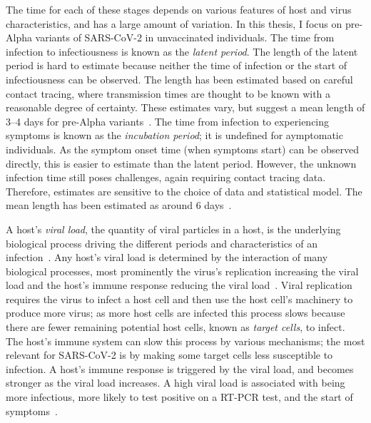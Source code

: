 \documentclass[thesis.tex]{subfiles}
\begin{document}
The time for each of these stages depends on various features of host and virus characteristics, and has a large amount of variation.
In this thesis, I focus on pre-Alpha variants of SARS-CoV-2 in unvaccinated individuals.
The time from infection to infectiousness is known as the \emph{latent period}.
The length of the latent period is hard to estimate because neither the time of infection or the start of infectiousness can be observed.
The length has been estimated based on careful contact tracing, where transmission times are thought to be known with a reasonable degree of certainty.
These estimates vary, but suggest a mean length of 3--4 days for pre-Alpha variants~\autocite[and references therein]{zhaoEstimating}.
The time from infection to experiencing symptoms is known as the \emph{incubation period}; it is undefined for aymptomatic individuals.
As the symptom onset time (when symptoms start) can be observed directly, this is easier to estimate than the latent period.
However, the unknown infection time still poses challenges, again requiring contact tracing data.
Therefore, estimates are sensitive to the choice of data and statistical model.
The mean length has been estimated as around 6 days~\autocite{wuIncubation,quesadaIncubation,aleneSerial}.

A host's \emph{viral load}, the quantity of viral particles in a host, is the underlying biological process driving the different periods and characteristics of an infection~\autocite{puhachSARSCoV2}.
Any host's viral load is determined by the interaction of many biological processes, most prominently the virus's replication increasing the viral load and the host's immune response reducing the viral load~\autocite{keVivo}.
Viral replication requires the virus to infect a host cell and then use the host cell's machinery to produce more virus; as more host cells are infected this process slows because there are fewer remaining potential host cells, known as \emph{target cells}, to infect.
The host's immune system can slow this process by various mechanisms; the most relevant for SARS-CoV-2 is by making some target cells less susceptible to infection.
A host's immune response is triggered by the viral load, and becomes stronger as the viral load increases.
A high viral load is associated with being more infectious, more likely to test positive on a RT-PCR test, and the start of symptoms~\autocite{puhachSARSCoV2,keVivo}.


\end{document}
